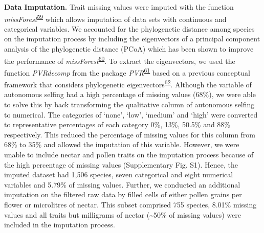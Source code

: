 \documentclass[12pt,a4paper,]{article}
\begin{document}
\textbf{Data Imputation.} Trait missing values were imputed with the
function
\emph{missForest}\textsuperscript{\protect\hyperlink{ref-stekhoven2012}{59}}
which allows imputation of data sets with continuous and categorical
variables. We accounted for the phylogenetic distance among species on
the imputation process by including the eigenvectors of a principal
component analysis of the phylogenetic distance (PCoA) which has been
shown to improve the performance of
\emph{missForest}\textsuperscript{\protect\hyperlink{ref-penone2014}{60}}.
To extract the eigenvectors, we used the function \emph{PVRdecomp} from
the package
\emph{PVR}\textsuperscript{\protect\hyperlink{ref-santos2018}{61}} based
on a previous conceptual framework that considers phylogenetic
eigenvectors\textsuperscript{\protect\hyperlink{ref-diniz-filho2012}{62}}.
Although the variable of autonomous selfing had a high percentage of
missing values (68\%), we were able to solve this by back transforming
the qualitative column of autonomous selfing to numerical. The
categories of `none', `low', `medium' and `high' were converted to
representative percentages of each category 0\%, 13\%, 50.5\% and 88\%
respectively. This reduced the percentage of missing values for this
column from 68\% to 35\% and allowed the imputation of this variable.
However, we were unable to include nectar and pollen traits on the
imputation process because of the high percentage of missing values
(Supplementary Fig. S1). Hence, the imputed dataset had 1,506 species,
seven categorical and eight numerical variables and 5.79\% of missing
values. Further, we conducted an additional imputation on the filtered
raw data by filled cells of either pollen grains per flower or
microlitres of nectar. This subset comprised 755 species, 8.01\% missing
values and all traits but milligrams of nectar (\textasciitilde{}50\% of
missing values) were included in the imputation process.
\end{document}
